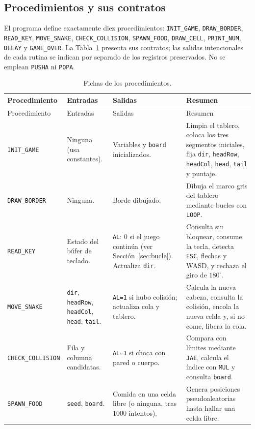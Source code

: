 \documentclass[10pt]{article}
\begin{document}
\subsection{Procedimientos y sus contratos}
El programa define exactamente diez procedimientos: \texttt{INIT\_GAME}, \texttt{DRAW\_BORDER}, \texttt{READ\_KEY}, \texttt{MOVE\_SNAKE}, \texttt{CHECK\_COLLISION}, \texttt{SPAWN\_FOOD}, \texttt{DRAW\_CELL}, \texttt{PRINT\_NUM}, \texttt{DELAY} y \texttt{GAME\_OVER}. La Tabla~\ref{tab:fichas} presenta sus contratos; las salidas intencionales de cada rutina se indican por separado de los registros preservados. No se emplean \texttt{PUSHA} ni \texttt{POPA}.

\begin{longtable}{@{}p{2.5cm}p{3cm}p{2.6cm}p{5cm}@{}}
\caption{Fichas de los procedimientos.}\label{tab:fichas}\\
\toprule
Procedimiento & Entradas & Salidas & Resumen \\
\midrule
\endfirsthead
\toprule
Procedimiento & Entradas & Salidas & Resumen \\
\midrule
\endhead
\bottomrule
\endfoot
\texttt{INIT\_GAME} & Ninguna (usa constantes). & Variables y \texttt{board} inicializados. & Limpia el tablero, coloca los tres segmentos iniciales, fija \texttt{dir}, \texttt{headRow}, \texttt{headCol}, \texttt{head}, \texttt{tail} y puntaje. \\
\texttt{DRAW\_BORDER} & Ninguna. & Borde dibujado. & Dibuja el marco gris del tablero mediante bucles con \texttt{LOOP}. \\
\texttt{READ\_KEY} & Estado del búfer de teclado. & \texttt{AL}: 0 si el juego continúa (ver Sección~\ref{sec:bucle}). Actualiza \texttt{dir}. & Consulta sin bloquear, consume la tecla, detecta \texttt{ESC}, flechas y WASD, y rechaza el giro de $180^\circ$. \\
\texttt{MOVE\_SNAKE} & \texttt{dir}, \texttt{headRow}, \texttt{headCol}, \texttt{head}, \texttt{tail}. & \texttt{AL=1} si hubo colisión; actualiza cola y tablero. & Calcula la nueva cabeza, consulta la colisión, encola la nueva celda y, si no come, libera la cola. \\
\texttt{CHECK\_COLLISION} & Fila y columna candidatas. & \texttt{AL=1} si choca con pared o cuerpo. & Compara con límites mediante \texttt{JAE}, calcula el índice con \texttt{MUL} y consulta \texttt{board}. \\
\texttt{SPAWN\_FOOD} & \texttt{seed}, \texttt{board}. & Comida en una celda libre (o ninguna, tras 1000 intentos). & Genera posiciones pseudoaleatorias hasta hallar una celda libre. \\

\end{longtable}
\end{document}

